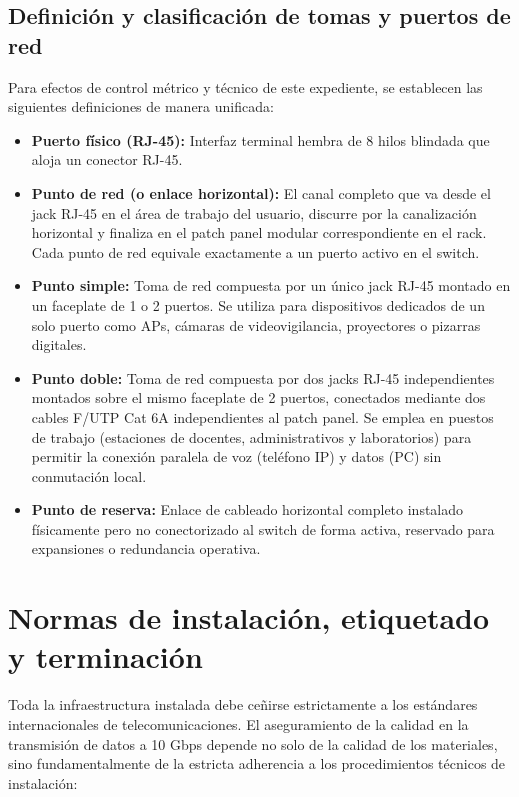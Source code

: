 \subsection*{Definición y clasificación de tomas y puertos de red}

Para efectos de control métrico y técnico de este expediente, se establecen las siguientes definiciones de manera unificada:
\begin{itemize}
    \item \textbf{Puerto físico (RJ-45):} Interfaz terminal hembra de 8 hilos blindada que aloja un conector RJ-45.
    \item \textbf{Punto de red (o enlace horizontal):} El canal completo que va desde el jack RJ-45 en el área de trabajo del usuario, discurre por la canalización horizontal y finaliza en el patch panel modular correspondiente en el rack. Cada punto de red equivale exactamente a un puerto activo en el switch.
    \item \textbf{Punto simple:} Toma de red compuesta por un único jack RJ-45 montado en un faceplate de 1 o 2 puertos. Se utiliza para dispositivos dedicados de un solo puerto como APs, cámaras de videovigilancia, proyectores o pizarras digitales.
    \item \textbf{Punto doble:} Toma de red compuesta por dos jacks RJ-45 independientes montados sobre el mismo faceplate de 2 puertos, conectados mediante dos cables F/UTP Cat 6A independientes al patch panel. Se emplea en puestos de trabajo (estaciones de docentes, administrativos y laboratorios) para permitir la conexión paralela de voz (teléfono IP) y datos (PC) sin conmutación local.
    \item \textbf{Punto de reserva:} Enlace de cableado horizontal completo instalado físicamente pero no conectorizado al switch de forma activa, reservado para expansiones o redundancia operativa.
\end{itemize}


\section{Normas de instalación, etiquetado y terminación}

Toda la infraestructura instalada debe ceñirse estrictamente a los estándares internacionales de telecomunicaciones. El aseguramiento de la calidad en la transmisión de datos a 10 Gbps depende no solo de la calidad de los materiales, sino fundamentalmente de la estricta adherencia a los procedimientos técnicos de instalación:

